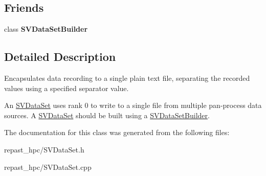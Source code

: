 \subsection*{Friends}
\begin{DoxyCompactItemize}
\item 
\hypertarget{classrepast_1_1_s_v_data_set_a4e3439f25e70c1f10ce7e842f97bc314}{class {\bfseries S\-V\-Data\-Set\-Builder}}\label{classrepast_1_1_s_v_data_set_a4e3439f25e70c1f10ce7e842f97bc314}

\end{DoxyCompactItemize}


\subsection{Detailed Description}
Encapsulates data recording to a single plain text file, separating the recorded values using a specified separator value. 

An \hyperlink{classrepast_1_1_s_v_data_set}{S\-V\-Data\-Set} uses rank 0 to write to a single file from multiple pan-\/process data sources. A \hyperlink{classrepast_1_1_s_v_data_set}{S\-V\-Data\-Set} should be built using a \hyperlink{classrepast_1_1_s_v_data_set_builder}{S\-V\-Data\-Set\-Builder}. 

The documentation for this class was generated from the following files\-:\begin{DoxyCompactItemize}
\item 
repast\-\_\-hpc/S\-V\-Data\-Set.\-h\item 
repast\-\_\-hpc/S\-V\-Data\-Set.\-cpp\end{DoxyCompactItemize}
